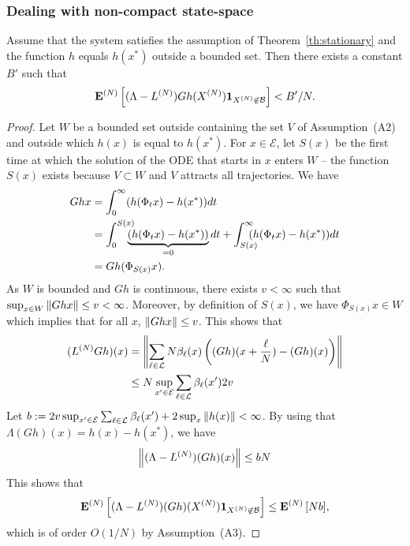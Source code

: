 \documentclass[acmlarge]{acmart}
\newcommand\XN{X^{(N)}}
\newcommand\LN{L^{(N)}}
\newcommand\E{\mathcal{E}}
\newcommand\calL{\mathcal{L}}
\newcommand\calB{\mathcal{B}}
\newcommand\espN[1]{{\mathchoice{\bespN{#1}}{\sespN{#1}}{\sespN{#1}}{\sespN{#1}}}}
\newcommand\bespN[1]{\mathbf{E}^{(N)}\left[#1\right]}
\newcommand\sespN[1]{\mathbf{E}^{(N)}[#1]}
\newcommand\norm[1]{{\mathchoice{\bnorm{#1}}{\snorm{#1}}{\snorm{#1}}{\snorm{#1}}}}
\newcommand\bnorm[1]{\left\|#1\right\|}
\newcommand\snorm[1]{\|#1\|}
\newcommand\p[1]{\left(#1\right)}
\begin{document}
\subsubsection{Dealing with non-compact state-space}

\begin{lemma}\label{lem:proof_ss2} Assume that the system satisfies the
  assumption of Theorem~\ref{th:stationary} and the function $h$
  equals $h(x^*)$ outside a bounded set. Then there exists a constant
  $B'$ such that
  \begin{align*}
    \espN{(\Lambda-\LN)Gh(\XN)\mathbf{1}_{\XN\not\in\calB}}<B'/N.
  \end{align*}
\end{lemma}

\begin{proof}
  Let $W$ be a bounded set outside containing the set $V$ of
  Assumption~(A2) and outside which $h(x)$ is equal to $h(x^*)$. For
  $x\in\E$, let $S(x)$ be the first time at which the solution of the
  ODE that starts in $x$ enters $W$ -- the function $S(x)$ exists
  because $V\subset W$ and $V$ attracts all trajectories. We have
  \begin{align*}
    Gh x &= \int_0^\infty (h(\Phi_t x) - h(x^*)) dt\\
         &=\int_0^{S(x)}\hspace{-.3cm}\underbrace{(h(\Phi_t
           x) - h(x^*))}_{=0}dt + 
           \int_{S(x)}^{\infty}\hspace{-.3cm}(h(\Phi_t x) - h(x^*))dt\\
         &=Gh(\Phi_{S(x)}x).
  \end{align*}
  As $W$ is bounded and $Gh$ is continuous, there exists $v<\infty$
  such that $\sup_{x\in W}\norm{Ghx}\le v<\infty$. Moreover, by
  definition of $S(x)$, we have $\Phi_{S(x)}x\in W$ which implies that
  for all $x$, $\norm{Ghx}\le v$.  This shows that
  \begin{align*}
    (\LN Gh)(x) &= \norm{\sum_{\ell\in\calL}
                  N\beta_\ell(x)\p{(Gh)(x+\frac{\ell}{N})-(Gh)(x)}}\\
                &\le N \sup_{x'\in\E}\sum_{\ell\in\calL}\beta_\ell(x')
                  2v
  \end{align*}
  Let
  $b:=2v\sup_{x'\in\E}\sum_{\ell\in\calL}\beta_\ell(x')+2\sup_{x}\norm{h(x)}<\infty$. By
  using that $\Lambda(Gh)(x)=h(x)-h(x^*)$, we have
  \begin{align*}
    \norm{(\Lambda- \LN)(Gh)(x)} \le bN
  \end{align*}
  This shows that 
  \begin{align*}
    \espN{ (\Lambda-\LN)(Gh)(\XN)\mathbf{1}_{\XN\not\in\calB}}
    \le \espN{Nb},
  \end{align*}
  which is of order $O(1/N)$ by Assumption~(A3).
\end{proof}
\end{document}
